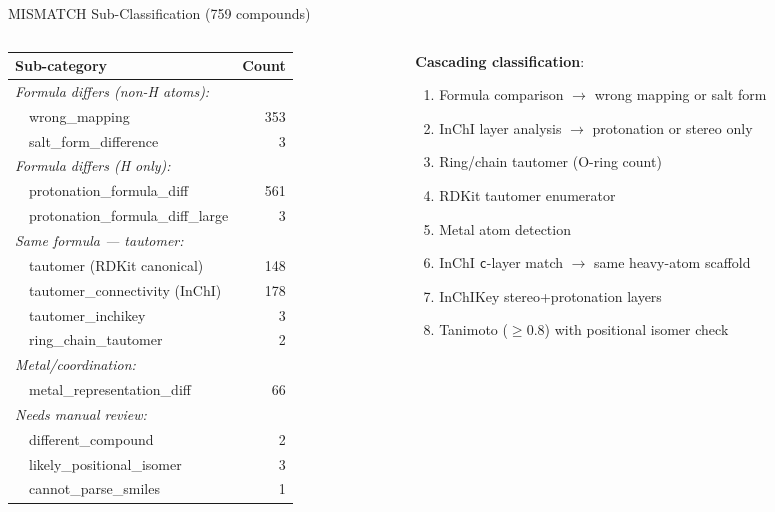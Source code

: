 \documentclass[aspectratio=169,11pt]{beamer}
\begin{document}
\begin{frame}{MISMATCH Sub-Classification (759 compounds)}

\vspace{-2pt}
\begin{columns}[T]
\begin{column}{0.50\textwidth}
\scriptsize
\begin{tabular}{lr}
\toprule
\textbf{Sub-category} & \textbf{Count} \\
\midrule
\multicolumn{2}{l}{\textit{Formula differs (non-H atoms):}} \\
~~wrong\_mapping           & 353 \\
~~salt\_form\_difference    &   3 \\[2pt]
\multicolumn{2}{l}{\textit{Formula differs (H only):}} \\
~~protonation\_formula\_diff       & 561 \\
~~protonation\_formula\_diff\_large &   3 \\[2pt]
\multicolumn{2}{l}{\textit{Same formula --- tautomer:}} \\
~~tautomer (RDKit canonical)      & 148 \\
~~tautomer\_connectivity (InChI)  & 178 \\
~~tautomer\_inchikey              &   3 \\
~~ring\_chain\_tautomer            &   2 \\[2pt]
\multicolumn{2}{l}{\textit{Metal/coordination:}} \\
~~metal\_representation\_diff      &  66 \\[2pt]
\multicolumn{2}{l}{\textit{Needs manual review:}} \\
~~different\_compound             &   2 \\
~~likely\_positional\_isomer       &   3 \\
~~cannot\_parse\_smiles            &   1 \\
\bottomrule
\end{tabular}
\end{column}

\begin{column}{0.46\textwidth}
\footnotesize
\textbf{Cascading classification}:
\begin{enumerate}\setlength\itemsep{1pt}
  \item Formula comparison $\to$ wrong mapping
        or salt form
  \item InChI layer analysis $\to$ protonation
        or stereo only
  \item Ring/chain tautomer (O-ring count)
  \item RDKit tautomer enumerator
  \item Metal atom detection
  \item InChI \texttt{c}-layer match $\to$
        same heavy-atom scaffold
  \item InChIKey stereo+protonation layers
  \item Tanimoto ($\geq$0.8) with positional
        isomer check
\end{enumerate}


\end{column}
\end{columns}
\end{frame}
\end{document}
